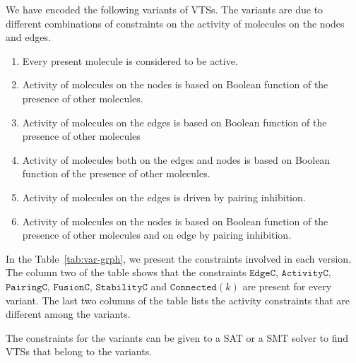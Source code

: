 We have encoded the following variants of VTSs.
%
The variants are due to different combinations of constraints on the
activity of molecules on the nodes and edges.
%
\begin{enumerate}
\item Every present molecule is considered to be active.
\item Activity of molecules on the nodes is based on Boolean function of the presence of other molecules. 
\item Activity of molecules on the edges is based on Boolean function of the presence of other molecules
\item Activity of molecules both on the edges and nodes is based on Boolean function of the presence of other molecules.
\item Activity of molecules on the edges is driven by pairing inhibition.
\item Activity of molecules on the nodes is based on Boolean function of the presence of other molecules and on edge by pairing inhibition.
\end{enumerate}
%
%

In the Table~\ref{tab:var-grph}, we present the constraints involved in each version.
%
The column two of the table shows that the constraints $\texttt{EdgeC}$, $\texttt{ActivityC}$, $\texttt{PairingC}$, $\texttt{FusionC}$, $\texttt{StabilityC}$ and $\texttt{Connected}(k)$ are present for every variant.
%
The last two columns of the table lists the activity constraints that are different among the variants.
%
%
%
%
%

%
The constraints for the variants can be given to a SAT or a SMT solver to find
VTSs that belong to the variants.
